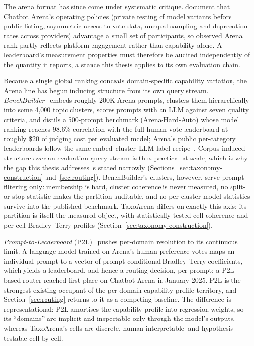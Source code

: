 The arena format has since come under systematic critique.
\textcite{singh2025leaderboard} document that Chatbot Arena's
operating policies (private testing of model variants before public
listing, asymmetric access to vote data, unequal sampling and
deprecation rates across providers) advantage a small set of
participants, so observed Arena rank partly reflects platform
engagement rather than capability alone. A leaderboard's measurement
properties must therefore be audited independently of the quantity it
reports, a stance this thesis applies to its own evaluation chain.

Because a single global ranking conceals domain-specific capability
variation, the Arena line has begun inducing structure from its own
query stream. \textit{BenchBuilder}~\parencite{li2024benchbuilder}
embeds roughly 200K Arena prompts, clusters them hierarchically into
some 4{,}000 topic clusters, scores prompts with an LLM against seven
quality criteria, and distils a 500-prompt benchmark
(Arena-Hard-Auto) whose model ranking reaches 98.6\% correlation with
the full human-vote leaderboard at roughly \$20 of judging cost per
evaluated model; Arena's public per-category leaderboards follow the
same embed--cluster--LLM-label
recipe~\parencite{arena2025categories}. Corpus-induced structure over
an evaluation query stream is thus practical at scale, which is why
the gap this thesis addresses is stated narrowly
(Sections~\ref{sec:taxonomy-construction} and~\ref{sec:routing}).
BenchBuilder's clusters, however, serve prompt filtering only:
membership is hard, cluster coherence is never measured, no
split-or-stop statistic makes the partition auditable, and no
per-cluster model statistics survive into the published benchmark.
TaxoArena differs on exactly this axis: its partition is itself the
measured object, with statistically tested cell coherence and
per-cell Bradley--Terry profiles
(Section~\ref{sec:taxonomy-construction}).

\textit{Prompt-to-Leaderboard} (P2L)~\parencite{frick2025p2l} pushes
per-domain resolution to its continuous limit. A language model
trained on Arena's human preference votes maps an individual prompt
to a vector of prompt-conditional Bradley--Terry coefficients, which
yields a leaderboard, and hence a routing decision, per prompt; a
P2L-based router reached first place on Chatbot Arena in January
2025. P2L is the strongest existing occupant of the per-domain
capability-profile territory, and Section~\ref{sec:routing} returns
to it as a competing baseline. The difference is representational:
P2L amortises the capability profile into regression weights, so its
``domains'' are implicit and inspectable only through the model's
outputs, whereas TaxoArena's cells are discrete, human-interpretable,
and hypothesis-testable cell by cell.


